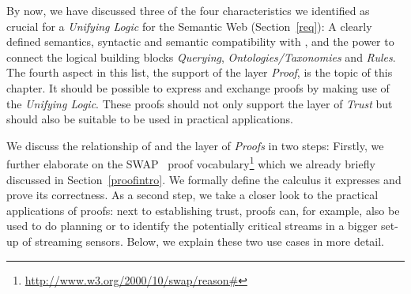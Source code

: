 By now, we have discussed three of the four characteristics we identified as crucial for a \emph{Unifying Logic} for the Semantic Web (Section~\ref{req}): 
A clearly defined semantics, 
syntactic and semantic compatibility with \rdf, and the power to connect the logical building blocks \emph{Querying}, \emph{Ontologies/Taxonomies} and \emph{Rules}. 
The fourth aspect in this list, the support of the layer \emph{Proof}, is the topic of this chapter. It should be possible to express and exchange proofs
 by making use of the \emph{Unifying Logic}. %
These proofs should not only support the layer of \emph{Trust} but should also be suitable to be used in practical applications.  

We discuss the relationship of \nthreelogic and the layer of \emph{Proofs} in two steps: Firstly, 
we further elaborate on the SWAP~\cite{SWAP} proof vocabulary\footnote{\url{http://www.w3.org/2000/10/swap/reason\#}} which we already briefly discussed in Section~\ref{proofintro}. 
We formally define the calculus it expresses and prove its correctness. As a second step, we take a closer look to the practical applications of proofs: next to establishing 
trust, proofs can, for example, also be used to do planning or to identify the potentially critical streams in a bigger set-up of streaming sensors. 
Below, we explain these two use cases in more detail.




